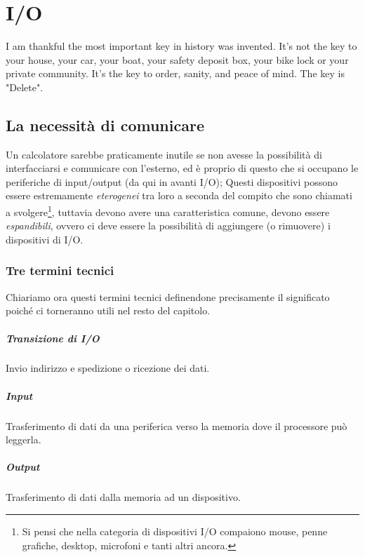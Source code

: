 \documentclass[class=book, crop=false, oneside]{standalone}
\begin{document}
\chapter{I/O}\begin{fquote}I am thankful the most important key in history was invented. It's not the key to your house, your car, your boat, your safety deposit box, your bike lock or your private community. It's the key to order, sanity, and peace of mind. The key is "Delete".
 \end{fquote}

\section{La necessità di comunicare}
Un calcolatore sarebbe praticamente inutile se non avesse la possibilità di interfacciarsi e comunicare con l'esterno, ed è proprio di questo che si occupano le periferiche di input/output (da qui in avanti I/O); Questi dispositivi possono essere estremamente \emph{eterogenei} tra loro a seconda del compito che sono chiamati a svolgere\footnote{Si pensi che nella categoria di dispositivi I/O compaiono mouse, penne grafiche, desktop, microfoni e tanti altri ancora.}, tuttavia devono avere una caratteristica comune, devono essere \emph{espandibili}, ovvero ci deve essere la possibilità di aggiungere (o rimuovere) i dispositivi di I/O.

\subsection*{Tre termini tecnici}
Chiariamo ora questi termini tecnici definendone precisamente il significato poiché ci torneranno utili nel resto del capitolo.
\paragraph{Transizione di I/O} Invio indirizzo e spedizione o ricezione dei dati.
\paragraph{Input} Trasferimento di dati da una periferica verso la memoria dove il processore può leggerla.
\paragraph{Output} Trasferimento di dati dalla memoria ad un dispositivo.
\end{document}
